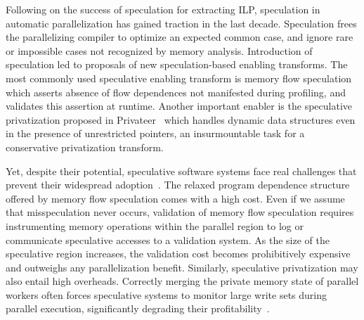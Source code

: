 Following on the success of speculation for extracting ILP,
speculation in automatic parallelization has gained traction in the
last decade.  Speculation frees the parallelizing compiler to optimize
an expected common case, and ignore rare or impossible cases not
recognized by memory analysis.  Introduction of speculation led to
proposals of new speculation-based enabling transforms.  The most
commonly used speculative enabling transform is memory flow
speculation which asserts absence of flow dependences not manifested
during profiling, and validates this assertion at runtime.
Another important enabler is the speculative privatization proposed in
Privateer~\cite{johnson:12:pldi} which handles dynamic data structures
even in the presence of unrestricted pointers, an insurmountable task
for a conservative privatization transform.
%
%


Yet, despite their potential, speculative software systems face real
challenges that prevent their widespread
adoption~\cite{cascaval:08:stmtoy:short,prabhu:03:ppopp,kelsey:09:cgo}.
%
%
The relaxed program dependence structure offered by memory flow
speculation comes with a high cost.  Even if we assume that
misspeculation never occurs, validation of memory flow speculation
requires instrumenting memory operations within the parallel region to
log or communicate speculative accesses to a validation system. As the
size of the speculative region increases, the validation cost becomes
prohibitively expensive and outweighs any parallelization benefit.
%
Similarly, speculative privatization may also entail high overheads.
Correctly merging the private memory state of parallel workers
often forces speculative systems to monitor large write sets during
parallel execution, significantly degrading their
profitability~\cite{kim:12:cgo,johnson:12:pldi,rauchwerger:99:pds}.

